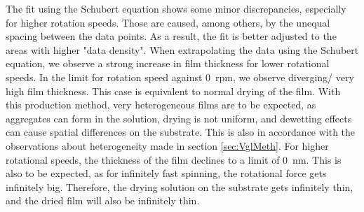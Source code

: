 The fit using the Schubert equation shows some minor discrepancies, especially for higher rotation speeds. Those are caused, among others, by the unequal spacing between the data points. As a result, the fit is better adjusted to the areas with higher "data density". When extrapolating the data using the Schubert equation, we observe a strong increase in film thickness for lower rotational speeds. In the limit for rotation speed against \SI{0}{rpm}, we observe diverging/ very high film thickness. This case is equivalent to normal drying of the film. With this production method, very heterogeneous films are to be expected, as aggregates can form in the solution, drying is not uniform, and dewetting effects can cause spatial differences on the substrate. This is also in accordance with the observations about heterogeneity made in section \ref{sec:VglMeth}. For higher rotational speeds, the thickness of the film declines to a limit of \SI{0}{nm}. This is also to be expected, as for infinitely fast spinning, the rotational force gets infinitely big. Therefore, the drying solution on the substrate gets infinitely thin, and the dried film will also be infinitely thin.
